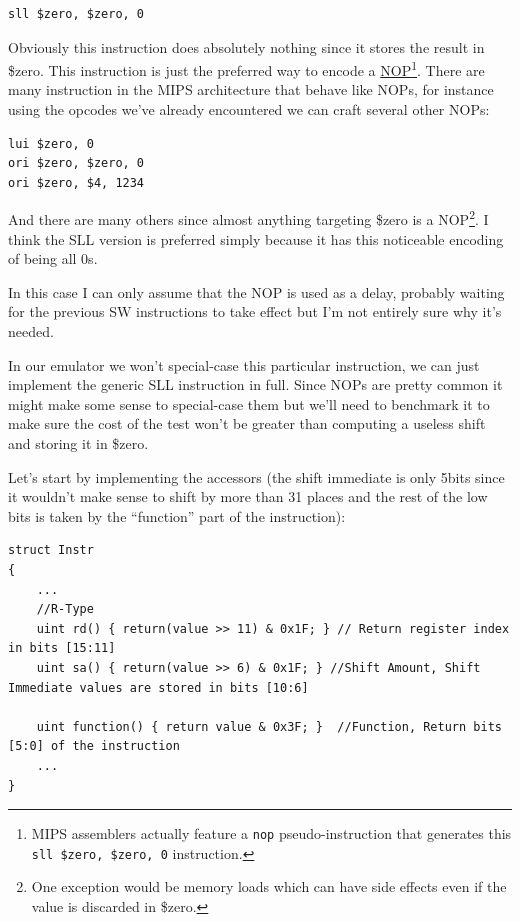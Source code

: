 \documentclass[a4paper]{article}
\newcommand{\code}[1] {\texttt{#1}}
\begin{document}
\begin{lstlisting}[language=assembly]
sll $zero, $zero, 0
\end{lstlisting}

Obviously this instruction does absolutely nothing since it stores the
result in \$zero. This instruction is just the preferred way to encode
a \href{https://en.wikipedia.org/wiki/NOP}{NOP}\footnote{MIPS
  assemblers actually feature a \code{nop} pseudo-instruction that
  generates this \mbox{\code{sll \$zero, \$zero, 0}} instruction.}.
There are many instruction in the MIPS architecture that behave like
NOPs, for instance using the opcodes we've already encountered we can
craft several other NOPs:

\begin{lstlisting}[language=assembly]
lui $zero, 0
ori $zero, $zero, 0
ori $zero, $4, 1234
\end{lstlisting}

And there are many others since almost anything targeting \$zero is a
NOP\footnote{One exception would be memory loads which can have side
  effects even if the value is discarded in \$zero.}. I think the SLL
version is preferred simply because it has this noticeable encoding of
being all 0s.

In this case I can only assume that the NOP is used as a delay,
probably waiting for the previous SW instructions to take effect but
I'm not entirely sure why it's needed.

In our emulator we won't special-case this particular instruction, we
can just implement the generic SLL instruction in full. Since NOPs are
pretty common it might make some sense to special-case them but we'll
need to benchmark it to make sure the cost of the test won't be
greater than computing a useless shift and storing it in \$zero.

Let's start by implementing the accessors (the shift immediate is only
5bits since it wouldn't make sense to shift by more than 31 places and
the rest of the low bits is taken by the ``function'' part of the
instruction):

\begin{lstlisting}
struct Instr
{
	...
  	//R-Type
	uint rd() { return(value >> 11) & 0x1F; } // Return register index in bits [15:11]
	uint sa() { return(value >> 6) & 0x1F; } //Shift Amount, Shift Immediate values are stored in bits [10:6]
	
	uint function() { return value & 0x3F; }  //Function, Return bits [5:0] of the instruction
	...
}
\end{lstlisting}
\end{document}
